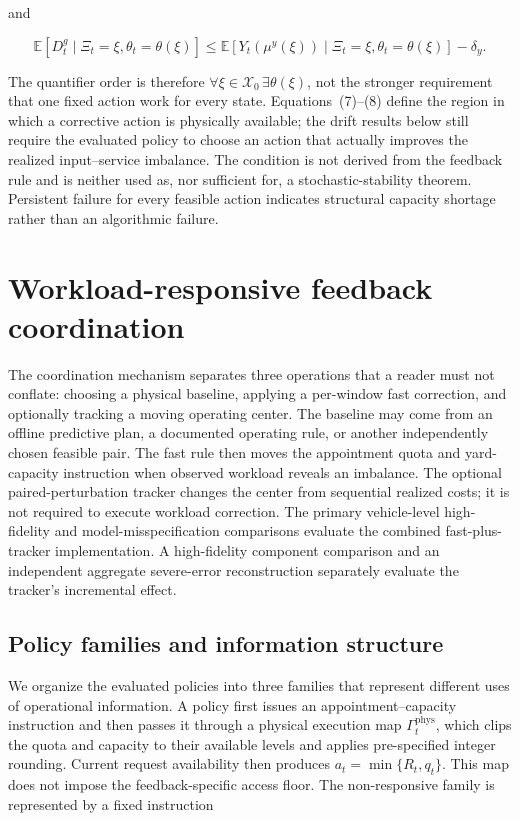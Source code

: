 \documentclass[preprint,12pt,authoryear,a4paper]{elsarticle}
\begin{document}
and

\[
\mathbb E[D_t^g\mid \Xi_t=\xi,\theta_t=\theta(\xi)]
\le \mathbb E[Y_t(\mu^y(\xi))\mid \Xi_t=\xi,\theta_t=\theta(\xi)]-\delta_y.
\tag{8}
\]

The quantifier order is therefore \(\forall\xi\in\mathcal X_0\,\exists\theta(\xi)\), not the stronger requirement that one fixed action work for every state. Equations~(7)--(8) define the region in which a corrective action is physically available; the drift results below still require the evaluated policy to choose an action that actually improves the realized input--service imbalance. The condition is not derived from the feedback rule and is neither used as, nor sufficient for, a stochastic-stability theorem. Persistent failure for every feasible action indicates structural capacity shortage rather than an algorithmic failure.

\section{Workload-responsive feedback coordination}
\label{sec:feedback-coordination}

The coordination mechanism separates three operations that a reader must not conflate: choosing a physical baseline, applying a per-window fast correction, and optionally tracking a moving operating center. The baseline may come from an offline predictive plan, a documented operating rule, or another independently chosen feasible pair. The fast rule then moves the appointment quota and yard-capacity instruction when observed workload reveals an imbalance. The optional paired-perturbation tracker changes the center from sequential realized costs; it is not required to execute workload correction. The primary vehicle-level high-fidelity and model-misspecification comparisons evaluate the combined fast-plus-tracker implementation. A high-fidelity component comparison and an independent aggregate severe-error reconstruction separately evaluate the tracker's incremental effect.

\subsection{Policy families and information structure}
\label{subsec:4-1-policy-class-and-information-structure}

We organize the evaluated policies into three families that represent different uses of operational information. A policy first issues an appointment--capacity instruction and then passes it through a physical execution map \(\Gamma_t^{\mathrm{phys}}\), which clips the quota and capacity to their available levels and applies pre-specified integer rounding. Current request availability then produces \(a_t=\min\{R_t,q_t\}\). This map does not impose the feedback-specific access floor. The non-responsive family is represented by a fixed instruction
\end{document}
